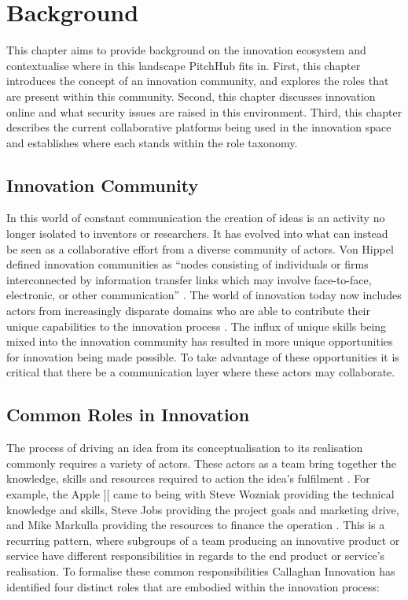 \chapter{Background}\label{background}

This chapter aims to provide background on the innovation ecosystem and contextualise where in this landscape PitchHub fits in. First, this chapter introduces the concept of an innovation community, and explores the roles that are present within this community. Second, this chapter discusses innovation online and what security issues are raised in this environment. Third, this chapter describes the current collaborative platforms being used in the innovation space and establishes where each stands within the role taxonomy. 

\section{Innovation Community}
In this world of constant communication the creation of ideas is an activity no longer isolated to inventors or researchers. It has evolved into what can instead be seen as a collaborative effort from a diverse community of actors. Von Hippel defined innovation communities as ``nodes consisting of individuals or firms interconnected by information transfer links which may involve face-to-face, electronic, or other communication'' \cite{von2005democratizing}. The world of innovation today now includes actors from increasingly disparate domains who are able to contribute their unique capabilities to the innovation process \cite{che2003optimal}. The influx of unique skills being mixed into the innovation community has resulted in more unique opportunities for innovation being made possible. To take advantage of these opportunities it is critical that there be a communication layer where these actors may collaborate.

\section{Common Roles in Innovation}\label{commonRolesInInnovation}

The process of driving an idea from its conceptualisation to its realisation commonly requires a variety of actors. These actors as a team bring together the knowledge, skills and resources required to action the idea's fulfilment \cite{engelberger1982robotics}. For example, the Apple ][ came to being with Steve Wozniak providing the technical knowledge and skills, Steve Jobs providing the project goals and marketing drive, and Mike Markulla providing the resources to finance the operation \cite{livingston2007founders}. This is a recurring pattern, where subgroups of a team producing an innovative product or service have different responsibilities in regards to the end product or service's realisation. To formalise these common responsibilities Callaghan Innovation has identified four distinct roles that are embodied within the innovation process:

